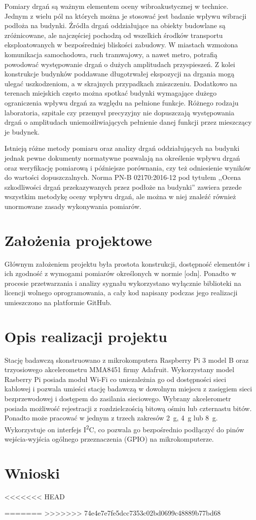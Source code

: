 \documentclass[a4paper,12pt]{mwart}
\begin{document}
Pomiary drgań są ważnym elementem oceny wibroakustycznej w technice. Jednym
z wielu pól na których można je stosować jest badanie wpływu wibracji
podłoża na budynki. Źródła drgań oddziałujące na obiekty budowlane są
zróżnicowane, ale najczęściej pochodzą od wszelkich środków transportu
eksploatowanych w bezpośredniej bliskości zabudowy. W miastach wzmożona
komunikacja samochodowa, ruch tramwajowy, a nawet metro, potrafią powodować
występowanie drgań o dużych amplitudach przyspieszeń. Z kolei konstrukcje
budynków poddawane długotrwałej ekspozycji na drgania mogą ulegać
uszkodzeniom, a w skrajnych przypadkach zniszczeniu. Dodatkowo na terenach
miejskich często można spotkać budynki wymagające dużego ograniczenia wpływu
drgań za względu na pełnione funkcje. Różnego rodzaju laboratoria, szpitale
czy przemysł precyzyjny nie dopuszczają występowania drgań o amplitudach
uniemożliwiających pełnienie danej funkcji przez mieszczący je budynek.

Istnieją różne metody pomiaru oraz analizy drgań oddziałujących na budynki
jednak pewne dokumenty normatywne pozwalają na określenie wpływu drgań oraz
weryfikację pomiarową i późniejsze porównania, czy też odniesienie wyników
do wartości dopuszczalnych. Norma PN-B 02170:2016-12 pod tytułem ,,Ocena
szkodliwości drgań przekazywanych przez podłoże na budynki'' \cite{norma}
zawiera przede wszystkim metodykę oceny wpływu drgań, ale można w niej
znaleźć również unormowane zasady wykonywania pomiarów.

\section{Założenia projektowe}

Głównym założeniem projektu była prostota konstrukcji, dostępność elementów i
ich zgodność z wymogami pomiarów określonych w normie [odn]. Ponadto w procesie
przetwarzania i analizy sygnału wykorzystano wyłącznie biblioteki na licencji
wolnego oprogramowania, a cały kod napisany podczas jego realizacji umieszczono
na platformie GitHub.

\section{Opis realizacji projektu}
Stację badawczą skonstruowano z mikrokomputera Raspberry Pi 3 model B oraz
trzyosiowego akcelerometru MMA8451 firmy Adafruit. Wykorzystany model Rasberry
Pi posiada moduł Wi-Fi co uniezależnia go od dostępności sieci kablowej i
pozwala umieści stację badawczą w dowolnym miejscu z zasięgiem sieci
bezprzewodowej i dostępem do zasilania sieciowego. Wybrany akcelerometr posiada
możliwość rejestracji z rozdzielczością bitową ośmiu lub czternastu bitów.
Ponadto może pracować w jednym z trzech zakresów \SI{2}{\g}, \SI{4}{\g} lub
\SI{8}{\g}. Wykorzystuje on interfejs I\textsuperscript{2}C, co pozwala go
bezpośrednio podłączyć do pinów wejścia-wyjścia ogólnego przeznaczenia (GPIO)
na mikrokomputerze.

\section{Wnioski}

<<<<<<< HEAD
\printbibliography

=======
>>>>>>> 74e4e7e7fe5dcc7353c02bd0699c48889b77bd68
\end{document}
